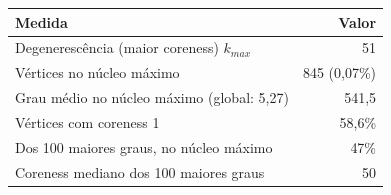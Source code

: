 \begin{tabular}{lr}
    \toprule
    Medida & Valor \\
    \midrule
    Degenerescência (maior coreness) $k_{max}$ & 51 \\
    Vértices no núcleo máximo & 845 (0,07\%) \\
    Grau médio no núcleo máximo (global: 5,27) & 541,5 \\
    Vértices com coreness 1 & 58,6\% \\
    Dos 100 maiores graus, no núcleo máximo & 47\% \\
    Coreness mediano dos 100 maiores graus & 50 \\
    \bottomrule
\end{tabular}
